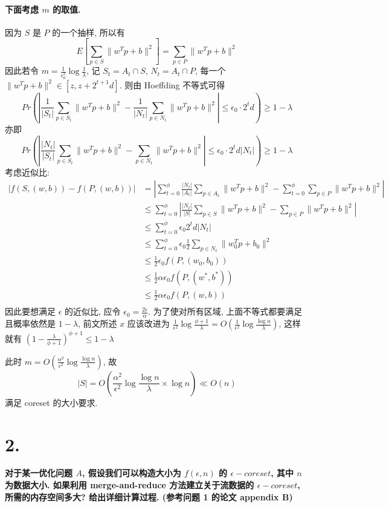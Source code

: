 \documentclass[UTF8]{article}
\newcommand{\jumpLine} {\hspace*{\fill} \par}
\begin{document}
\paragraph{下面考虑 $m$ 的取值.} 因为 $S$ 是 $P$ 的一个抽样, 所以有 
$$E\left[\sum\limits_{p\in S} \|w^Tp + b\|^2\right] = \sum\limits_{p\in P} \|w^Tp + b\|^2$$
因此若令 $m=\frac{1}{\epsilon_0^2}\log\frac{1}{\lambda}$, 记 $S_t=A_t\cap S$, $N_t=A_t\cap P$, 每一个 $\|w^Tp + b\|^2 \in [z,z+2^{t+1}d]$. 则由 Hoeffding 不等式可得
$$Pr\left( \left| \frac{1}{|S_t|}\sum\limits_{p\in S_t} \|w^Tp + b\|^2 - \frac{1}{|N_t|}\sum\limits_{p\in N_t} \|w^Tp + b\|^2 \right| \le \epsilon_0 \cdot 2^{t}d \right) \ge 1-\lambda $$
亦即
$$Pr\left( \left| \frac{|N_t|}{|S_t|}\sum\limits_{p\in S_t} \|w^Tp + b\|^2 - \sum\limits_{p\in N_t} \|w^Tp + b\|^2 \right| \le \epsilon_0 \cdot 2^{t}d |N_t| \right) \ge 1-\lambda $$
考虑近似比:
$$\begin{aligned}
	|f(S, (w,b)) - f(P, (w,b))| &= \left| \sum\limits_{t=0}^{\phi} \frac{|N_t|}{|A_t|} \sum\limits_{p\in A_t} \|w^Tp + b\|^2 - \sum\limits_{t=0}^{\phi}\sum\limits_{p\in P} \|w^Tp + b\|^2 \right| \\
	&\le \sum\limits_{t=0}^{\phi}\left|  \frac{|N_t|}{|S|}\sum\limits_{p\in S} \|w^Tp + b\|^2 - \sum\limits_{p\in P} \|w^Tp + b\|^2 \right| \\
	&\le \sum\limits_{t=0}^{\phi}\epsilon_0 2^t d |N_t| \\
	&\le \sum\limits_{t=0}^{\phi}\epsilon_0 \frac{1}{2} \sum\limits_{p\in N_t} \|w_0^Tp + b_0\|^2 \\
	&\le \frac{1}{2}\epsilon_0 f(P, (w_0,b_0)) \\
	&\le \frac{1}{2}\alpha\epsilon_0 f(P, (w^*,b^*)) \\
	&\le \frac{1}{2}\alpha\epsilon_0 f(P, (w,b)) \\
\end{aligned}$$
因此要想满足 $\epsilon$ 的近似比, 应令 $\epsilon_0=\frac{2\epsilon}{\alpha}$. 为了使对所有区域, 上面不等式都要满足且概率依然是 $1-\lambda$, 前文所述 $x$ 应该改进为 $\frac{1}{\epsilon^2}\log\frac{\phi + 1}{\lambda} = O(\frac{1}{\epsilon^2}\log\frac{\log n}{\lambda})$, 这样就有 $(1-\frac{\lambda}{\phi + 1})^{\phi + 1} \le 1-\lambda$
\\\jumpLine\noindent
此时 $m=O(\frac{\alpha^2}{\epsilon^2}\log\frac{\log n}{\lambda})$, 故 $$|S|=O(\frac{\alpha^2}{\epsilon^2}\log\frac{\log n}{\lambda}\times \log n) \ll O(n)$$
满足 coreset 的大小要求.

\newpage
\section*{2.}
\textbf{对于某一优化问题 $A$, 假设我们可以构造大小为 $f(\epsilon, n)$ 的 $\epsilon-coreset$, 其中 $n$ 为数据大小. 如果利用 merge-and-reduce 方法建立关于流数据的 $\epsilon-coreset$, 所需的内存空间多大? 给出详细计算过程. (参考问题 1 的论文 appendix B)}
\end{document}
